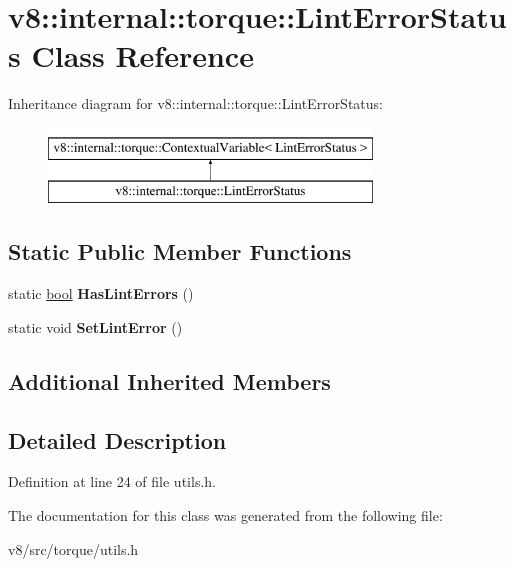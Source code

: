 \hypertarget{classv8_1_1internal_1_1torque_1_1LintErrorStatus}{}\section{v8\+:\+:internal\+:\+:torque\+:\+:Lint\+Error\+Status Class Reference}
\label{classv8_1_1internal_1_1torque_1_1LintErrorStatus}
Inheritance diagram for v8\+:\+:internal\+:\+:torque\+:\+:Lint\+Error\+Status\+:\begin{figure}[H]
\begin{center}
\leavevmode
\includegraphics[height=2.000000cm]{classv8_1_1internal_1_1torque_1_1LintErrorStatus}
\end{center}
\end{figure}
\subsection*{Static Public Member Functions}
\begin{DoxyCompactItemize}
\item 
\mbox{\label{classv8_1_1internal_1_1torque_1_1LintErrorStatus_a8e27995d1f442f31c0ca4feb96d0b57d}} 
static \mbox{\hyperlink{classbool}{bool}} {\bfseries Has\+Lint\+Errors} ()
\item 
\mbox{\label{classv8_1_1internal_1_1torque_1_1LintErrorStatus_a3c3050cfd177ef6bccf89f18334d948c}} 
static void {\bfseries Set\+Lint\+Error} ()
\end{DoxyCompactItemize}
\subsection*{Additional Inherited Members}


\subsection{Detailed Description}


Definition at line 24 of file utils.\+h.



The documentation for this class was generated from the following file\+:\begin{DoxyCompactItemize}
\item 
v8/src/torque/utils.\+h\end{DoxyCompactItemize}
